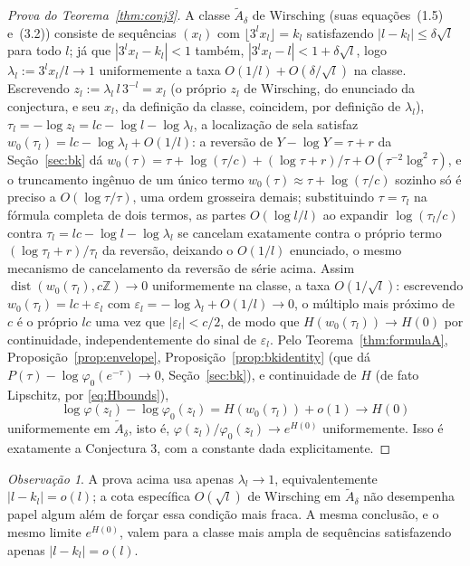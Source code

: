 \documentclass[11pt]{amsart}
\theoremstyle{plain}
\theoremstyle{definition}
\theoremstyle{remark}
\newtheorem{remark}[theorem]{Observação}
\newcommand{\Z}{\mathbb{Z}}
\begin{document}
\begin{proof}[Prova do Teorema~\ref{thm:conj3}]
A classe $\widetilde{A}_\delta$ de Wirsching (suas equações~(1.5) e~(3.2)) consiste de sequências
$(x_l)$ com $\lfloor 3^l x_l\rfloor = k_l$ satisfazendo $|l-k_l|\le\delta\sqrt l$ para todo $l$; já
que $|3^lx_l-k_l|<1$ também, $|3^lx_l-l|<1+\delta\sqrt l$, logo $\lambda_l := 3^lx_l/l \to 1$
uniformemente a taxa $O(1/l)+O(\delta/\sqrt l)$ na classe. Escrevendo $z_l :=
\lambda_l\, l\, 3^{-l} = x_l$ (o próprio $z_l$ de Wirsching, do enunciado da conjectura, e seu
$x_l$, da definição da classe, coincidem, por definição de $\lambda_l$), $\tau_l = -\log z_l = lc -
\log l - \log\lambda_l$, a localização de sela satisfaz $w_0(\tau_l) = lc - \log\lambda_l + O(1/l)$:
a reversão de $Y-\log Y=\tau+r$ da Seção~\ref{sec:bk} dá
$w_0(\tau) = \tau+\log(\tau/c)+(\log\tau+r)/\tau+O(\tau^{-2}\log^2\tau)$, e o truncamento ingênuo de
um único termo $w_0(\tau)\approx\tau+\log(\tau/c)$ sozinho só é preciso a $O(\log\tau/\tau)$, uma
ordem grosseira demais; substituindo $\tau=\tau_l$ na fórmula completa de dois termos, as partes
$O(\log l/l)$ ao expandir $\log(\tau_l/c)$ contra $\tau_l = lc-\log l-\log\lambda_l$ se cancelam
exatamente contra o próprio termo $(\log\tau_l+r)/\tau_l$ da reversão, deixando o $O(1/l)$
enunciado, o mesmo mecanismo de cancelamento da reversão de série acima. Assim
$\operatorname{dist}(w_0(\tau_l), c\Z) \to 0$ uniformemente na classe, a taxa $O(1/\sqrt l)$:
escrevendo $w_0(\tau_l) = lc + \varepsilon_l$ com $\varepsilon_l = -\log\lambda_l + O(1/l) \to 0$, o
múltiplo mais próximo de $c$ é o próprio $lc$ uma vez que $|\varepsilon_l|<c/2$, de modo que
$H(w_0(\tau_l)) \to H(0)$ por continuidade, independentemente do sinal de $\varepsilon_l$. Pelo
Teorema~\ref{thm:formulaA}, Proposição~\ref{prop:envelope}, Proposição~\ref{prop:bkidentity} (que
dá $P(\tau)-\log\varphi_0(e^{-\tau})\to0$, Seção~\ref{sec:bk}), e continuidade de $H$ (de fato
Lipschitz, por \eqref{eq:Hbounds}),
\[
\log\varphi(z_l) - \log\varphi_0(z_l) = H(w_0(\tau_l)) + o(1) \to H(0)
\]
uniformemente em $\widetilde{A}_\delta$, isto é, $\varphi(z_l)/\varphi_0(z_l) \to e^{H(0)}$
uniformemente. Isso é exatamente a Conjectura 3, com a constante dada explicitamente.
\end{proof}

\begin{remark}
A prova acima usa apenas $\lambda_l\to1$, equivalentemente $|l-k_l|=o(l)$; a cota específica
$O(\sqrt l)$ de Wirsching em $\widetilde{A}_\delta$ não desempenha papel algum além de forçar essa
condição mais fraca. A mesma conclusão, e o mesmo limite $e^{H(0)}$, valem para a classe mais ampla
de sequências satisfazendo apenas $|l-k_l|=o(l)$.
\end{remark}
\end{document}
